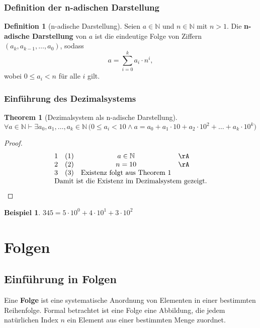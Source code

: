 \documentclass{book}
\theoremstyle{plain}
\newtheorem{theorem}{Theorem}
\theoremstyle{remark}
\theoremstyle{definition}
\newtheorem{definition}{Definition}[section]
\newtheorem*{example}{Beispiel}
\begin{document}
\subsection{Definition der n-adischen Darstellung}

\begin{definition}[n-adische Darstellung]
    Seien \( a \in \mathbb{N} \) und \( n \in \mathbb{N} \) mit \( n > 1 \). Die \textbf{n-adische Darstellung} von \( a \) ist die eindeutige Folge von Ziffern \( (a_k, a_{k-1}, \dots, a_0) \), sodass
    \[
    a = \sum_{i=0}^{k} a_i \cdot n^i,
    \]
    wobei \( 0 \leq a_i < n \) für alle \( i \) gilt.
\end{definition}

\subsection{Einführung des Dezimalsystems}

\begin{theorem}[Dezimalsystem als n-adische Darstellung]
    \(
    \forall a \in \mathbb{N} \vdash \exists a_0, a_1, \dots, a_k \in \mathbb{N} \,
    \big(
        0 \leq a_i < 10 \land 
        a = a_0 + a_1 \cdot 10 + a_2 \cdot 10^2 + \dots + a_k \cdot 10^k
    \big)
    \)
\end{theorem}

\begin{proof}
    \[
    \begin{array}{llcll p{5cm}}
        1 &  (1)  & a \in \mathbb{N} & \rA & \\
        2 &  (2)  & n = 10 & \rA & \\
        3 &  (3)  & \text{Existenz folgt aus Theorem 1} & & \\
        \multicolumn{5}{l}{\text{Damit ist die Existenz im Dezimalsystem gezeigt.}} \\
    \end{array}
    \]
\end{proof}

\begin{example}
    \(
    345 = 5 \cdot 10^0 + 4 \cdot 10^1 + 3 \cdot 10^2
    \)
\end{example}



\chapter{Folgen}

\section{Einführung in Folgen}
Eine \textbf{Folge} ist eine systematische Anordnung von Elementen in einer bestimmten Reihenfolge. Formal betrachtet ist eine Folge eine Abbildung, die jedem natürlichen Index \(n\) ein Element aus einer bestimmten Menge zuordnet.
\end{document}
